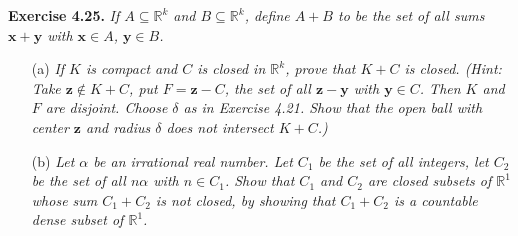 \documentclass{article}
\begin{document}



\textbf{Exercise 4.25.}
\emph{If $A \subseteq \mathbb{R}^k$ and $B \subseteq \mathbb{R}^k$,
define $A+B$ to be the set of all sums $\mathbf{x}+\mathbf{y}$ with
$\mathbf{x} \in A$, $\mathbf{y} \in B$.}

\begin{enumerate}
\item[(a)]
\emph{If $K$ is compact and $C$ is closed in $\mathbb{R}^k$,
prove that $K+C$ is closed.
(Hint: Take $\mathbf{z} \notin K+C$,
put $F = \mathbf{z}-C$,
the set of all $\mathbf{z}-\mathbf{y}$ with $\mathbf{y} \in C$.
Then $K$ and $F$ are disjoint.
Choose $\delta$ as in Exercise 4.21.
Show that the open ball with center $\mathbf{z}$ and radius $\delta$ does not intersect $K+C$.)}
\item[(b)]
\emph{Let $\alpha$ be an irrational real number.
Let $C_1$ be the set of all integers,
let $C_2$ be the set of all $n \alpha$ with $n \in C_1$.
Show that $C_1$ and $C_2$ are closed subsets of $\mathbb{R}^1$
whose sum $C_1 + C_2$ is not closed,
by showing that $C_1 + C_2$ is a countable dense subset of $\mathbb{R}^1$.} \\
\end{enumerate}
\end{document}
